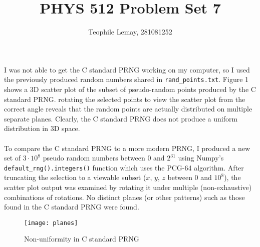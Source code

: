 \documentclass{article}
\title{PHYS 512 Problem Set 7}
\author{Teophile Lemay, 281081252}
\date{}
\newcommand{\<}[1]{\left\langle #1 \right\rangle }
\begin{document}
\maketitle

\section{}
I was not able to get the C standard PRNG working on my computer, so I used the previously produced random numbers shared in \texttt{rand\_points.txt}. Figure 1 shows a 3D scatter plot of the subset of pseudo-random points produced by the C standard PRNG. rotating the selected points to view the scatter plot from the correct angle reveals that the random points are actually distributed on multiple separate planes. Clearly, the C standard PRNG does not produce a uniform distribution in 3D space.\\
\\
To compare the C standard PRNG to a more modern PRNG, I produced a new set of $3\cdot 10^8$ pseudo random numbers between 0 and $2^31$ using Numpy's \texttt{default\_rng().integers()} function which uses the PCG-64 algorithm. After truncating the selection to a viewable subset ($x$, $y$, $z$ between 0 and $10^8$), the scatter plot output was examined by rotating it under multiple (non-exhaustive) combinations of rotations. No distinct planes (or other patterns) such as those found in the C standard PRNG were found.   
\begin{figure}
	\caption{Non-uniformity in C standard PRNG}
	\centering
	\texttt{[image: planes]}
\end{figure}
\end{document}
